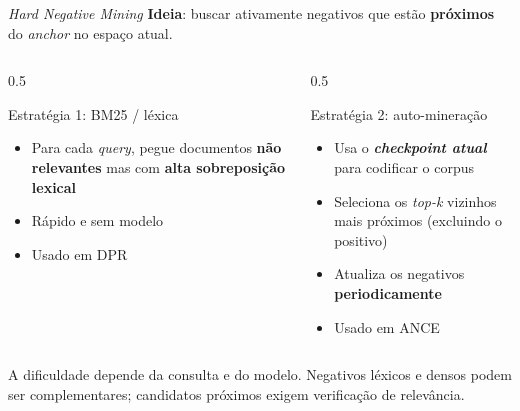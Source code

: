 \documentclass[aspectratio=169, xcolor=dvipsnames]{beamer}
\begin{document}
  \begin{frame}{\textit{Hard Negative Mining}}
    \textbf{Ideia}: buscar ativamente negativos que estão \textbf{próximos} do \textit{anchor} no espaço atual.

    \vspace{0.4em}
    \begin{columns}[T]
      \begin{column}{0.5\textwidth}
        \begin{block}{Estratégia 1: BM25 / léxica}
          \begin{itemize}
            \item Para cada \textit{query}, pegue documentos \textbf{não relevantes} mas com \textbf{alta sobreposição lexical}
            \item Rápido e sem modelo
            \item Usado em DPR 
          \end{itemize}
        \end{block}
      \end{column}
      \begin{column}{0.5\textwidth}
        \begin{block}{Estratégia 2: auto-mineração}
          \begin{itemize}
            \item Usa o \textbf{\textit{checkpoint atual}} para codificar o corpus
            \item Seleciona os \textit{top-k} vizinhos mais próximos (excluindo o positivo)
            \item Atualiza os negativos \textbf{periodicamente}
            \item Usado em ANCE 
          \end{itemize}
        \end{block}
      \end{column}
    \end{columns}
    \vspace{0.3em}
    A dificuldade depende da consulta e do modelo. Negativos léxicos e
    densos podem ser complementares; candidatos próximos exigem verificação de relevância.
  \end{frame}
\end{document}
